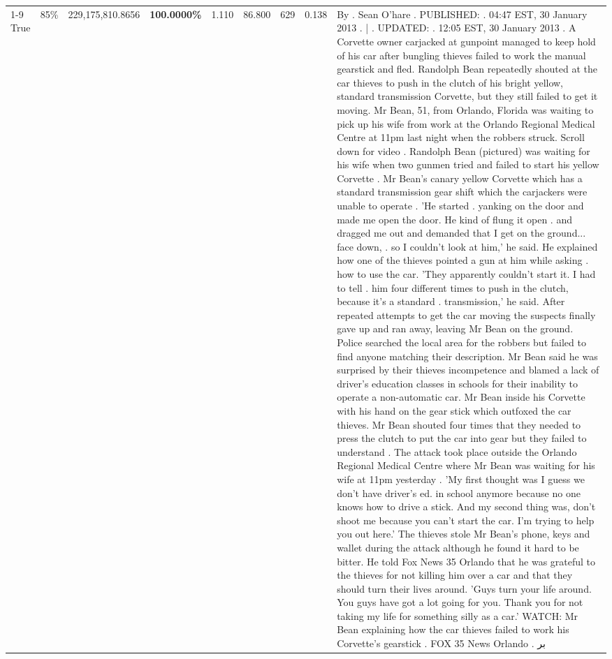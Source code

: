 \begin{table}[H]
\begin{tabular}{lllrlllll}
\cline{1-9} \cline{2-9}
True & 85\% & 229,175,810.8656 & \bfseries \color{red} 100.0000\% & 1.110 & 86.800 & 629 & 0.138 & By . Sean O'hare . PUBLISHED: . 04:47 EST, 30 January 2013 . | . UPDATED: . 12:05 EST, 30 January 2013 . A Corvette owner carjacked at gunpoint managed to keep hold of his car after bungling thieves failed to work the manual gearstick and fled. Randolph Bean repeatedly shouted at the car thieves to push in the clutch of his bright yellow, standard transmission Corvette, but they still failed to get it moving. Mr Bean, 51, from Orlando, Florida was waiting to pick up his wife from work at the Orlando Regional Medical Centre at 11pm last night when the robbers struck. Scroll down for video . Randolph Bean (pictured) was waiting for his wife when two gunmen tried and failed to start his yellow Corvette . Mr Bean's canary yellow Corvette which has a standard transmission gear shift which the carjackers were unable to operate . 'He started . yanking on the door and made me open the door. He kind of flung it open . and dragged me out and demanded that I get on the ground... face down, . so I couldn't look at him,' he said. He explained how one of the thieves pointed a gun at him while asking . how to use the car. 'They apparently couldn't start it. I had to tell . him four different times to push in the clutch, because it's a standard . transmission,' he said. After repeated attempts to get the car moving the suspects finally gave up and ran away, leaving Mr Bean on the ground. Police searched the local area for the robbers but failed to find anyone matching their description. Mr Bean said he was surprised by their thieves incompetence and blamed a lack of driver's education classes in schools for their inability to operate a non-automatic car. Mr Bean inside his Corvette with his hand on the gear stick which outfoxed the car thieves. Mr Bean shouted four times that they needed to press the clutch to put the car into gear but they failed to understand . The attack took place outside the Orlando Regional Medical Centre where Mr Bean was waiting for his wife at 11pm yesterday . 'My first thought was I guess we don't have driver's ed. in school anymore because no one knows how to drive a stick. And my second thing was, don't shoot me because you can't start the car. I'm trying to help you out here.' The thieves stole Mr Bean's phone, keys and wallet during the attack although he found it hard to be bitter. He told Fox News 35 Orlando that he was grateful to the thieves for not killing him over a car and that they should turn their lives around. 'Guys turn your life around. You guys have got a lot going for you. Thank you for not taking my life for something silly as a car.' WATCH: Mr Bean explaining how the car thieves failed to work his Corvette's gearstick . FOX 35 News Orlando . بر \\

\end{tabular}
\end{table}
